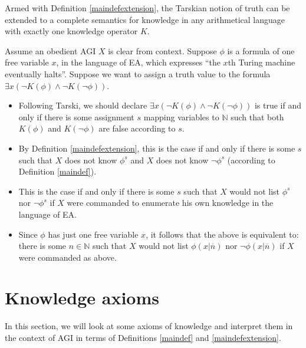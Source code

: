 \documentclass[runningheads]{llncs}
\begin{document}
Armed with Definition \ref{maindefextension}, the Tarskian notion
\cite{sep-tarski-truth} of
truth can be extended to a complete semantics for
knowledge in any arithmetical language with exactly one knowledge operator $K$.

\begin{example}
  Assume an obedient AGI $X$ is clear from context.
  Suppose $\phi$ is a formula of one free variable $x$, in the language of EA,
  which expresses ``the $x$th Turing machine eventually halts''. Suppose we want to
  assign a truth value to the formula $\exists x (\neg K(\phi)\wedge \neg K(\neg\phi))$.
  \begin{itemize}
  \item Following Tarski, we should declare $\exists x (\neg K(\phi)\wedge\neg K(\neg \phi))$
  is true if and only if there is some assignment $s$ mapping variables to $\mathbb N$
  such that both $K(\phi)$ and $K(\neg\phi)$ are false according to $s$.
  \item By Definition \ref{maindefextension}, this is the case if and only if
  there is some $s$ such that
  $X$ does not know $\phi^s$ and $X$ does not know $\neg\phi^s$
  (according to Definition \ref{maindef}).
  \item
  This is the case if and only if there is some $s$ such that $X$ would not
  list $\phi^s$ nor $\neg\phi^s$ if $X$ were commanded
  to enumerate his own knowledge in the language of EA.
  \item
  Since $\phi$ has just one free variable $x$, it follows that the above is equivalent to:
  there is some $n\in\mathbb N$ such that $X$ would not list $\phi(x|\overline n)$
  nor $\neg\phi(x|\overline n)$
  if $X$ were commanded as above.
  \end{itemize}
\end{example}

\section{Knowledge axioms}
\label{appsection}

In this section, we will look at some axioms of knowledge and interpret them in the
context of AGI in terms of Definitions \ref{maindef} and \ref{maindefextension}.
\end{document}
